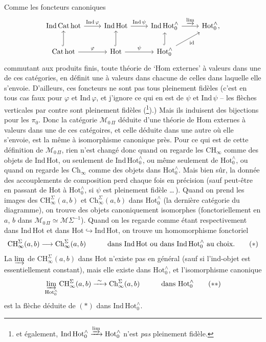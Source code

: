 \documentclass[11pt]{article}
\newcommand{\printedpage}[1]{\marginpar{\footnotesize p.~#1}}
\newcommand{\msp}[1]{\marginpar{\footnotesize [#1]}}
\newcommand{\HotO}{\mathrm{Hot}_0^{\wedge}}
\newcommand{\MOP}{\mathcal{M}_{0\,\Pi}}
\begin{document}
\msp{page 9}
Comme les foncteurs canoniques
\[
\begin{tikzcd}
\mathrm{Ind\,Cat\,hot} \arrow[r, "\mathrm{Ind}\,\varphi"] & \mathrm{Ind\,Hot} \arrow[r, "\mathrm{Ind}\,\psi"] & \mathrm{Ind\,Hot}_0^{\wedge} \arrow[r, "\varinjlim"] & \mathrm{Hot}_0^{\wedge},\\
\mathrm{Cat\,hot} \arrow[u, hook] \arrow[r, "\varphi"] & \mathrm{Hot} \arrow[u, hook] \arrow[r, "\psi"] & \mathrm{Hot}_0^{\wedge} \arrow[u, hook] \arrow[ur, "\mathrm{id}"'] &
\end{tikzcd}
\]
commutant aux produits finis, toute théorie de `Hom externes' à valeurs dans une de ces catégories, en définit une à valeurs dans chacune de celles dans laquelle elle s'envoie.
\printedpage{7}
D'ailleurs, ces foncteurs ne sont pas tous pleinement fidèles (c'est en tous cas faux pour $\varphi$ et $\mathrm{Ind}\,\varphi$, et j'ignore ce qui en est de $\psi$ et $\mathrm{Ind}\,\psi$ -- les flèches verticales par contre sont pleinement fidèles (\footnote[3]{et également, $\mathrm{Ind\,Hot}_0^{\wedge}\xrightarrow{\varinjlim}\mathrm{Hot}_0^{\wedge}$ n'est \textit{pas} pleinement fidèle.}).) Mais ils induisent des bijections pour les $\pi_0$. Donc la catégorie $\MOP$ déduite d'une théorie de Hom externes à valeurs dans une de ces catégoires, et celle %
déduite dans une autre où elle s'envoie, est la même à isomorphisme canonique près. Pour ce qui est de cette définition de $\MOP$, rien n'est changé donc quand on regarde les $\mathrm{CH}_{\infty}$ comme des objets de Ind\,Hot, ou seulement de $\mathrm{Ind\,Hot}_0^{\wedge}$, ou même seulement de $\HotO$, ou quand on regarde les $\mathrm{Ch}_{\infty}$ comme des objets
\msp{page 10}
dans $\HotO$. Mais bien sûr, la donnée des accouplements de composition perd chaque fois en précision (sauf peut-être en passant de Hot à $\HotO$, si $\psi$ est pleinement fidèle \dots\,). Quand on prend les images des $\mathrm{CH}^{\Sigma}_{\infty}(a,b)$ et $\mathrm{Ch}^{\Sigma}_{\infty}(a,b)$ dans $\HotO$ (la dernière catégorie du diagramme), on trouve des objets canoniquement isomorphes (fonctoriellement en $a$, $b$ dans $\MOP\simeq\mathcal{M}\Sigma^{-1}$). Quand on les regarde comme étant respectivement dans Ind\,Hot et dans $\mathrm{Hot}\hookrightarrow\mathrm{Ind\,Hot}$, on trouve un homomorphisme fonctoriel
\[
\mathrm{CH}^{\Sigma}_{\infty}(a,b)\longrightarrow\mathrm{Ch}^{\Sigma}_{\infty}(a,b) \qquad\quad \text{dans Ind\,Hot ou dans } \mathrm{Ind\,Hot}_0^{\wedge} \text{ au choix.} \tag*{$(*)$}
\]
La $\varinjlim$ de $\mathrm{CH}^{\Sigma}_{\infty}(a,b)$ dans Hot n'existe pas en général (sauf si l'ind-objet est essentiellement constant), mais elle existe dans $\HotO$, et l'isomorphisme canonique
\[
\varinjlim_{\HotO}\mathrm{CH}^{\Sigma}_{\infty}(a,b)\xrightarrow{\ \sim\ }\mathrm{Ch}^{\Sigma}_{\infty}(a,b) \qquad\quad \text{dans } \HotO \tag*{$(**)$}
\]
est la flèche déduite de $(*)$ dans $\mathrm{Ind\,Hot}_0^{\wedge}$.
\end{document}
